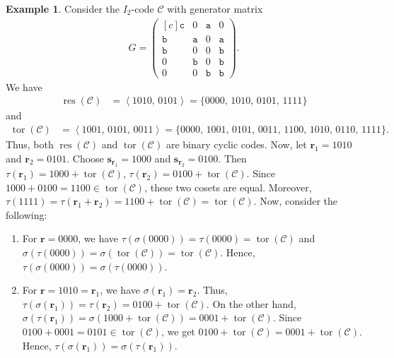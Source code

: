 \documentclass[12pt]{article}
\theoremstyle{definition}
\newtheorem{example}[example]{Example}
\theoremstyle{plain}
\begin{document}
\begin{example}
Consider the $I_2$-code $\mathcal{C}$ with generator matrix
\begin{align*}
G=
\begin{pmatrix*}[c]
\mathtt{c} & 0 & \mathtt{a} & 0 \\
\mathtt{b} & \mathtt{a} & 0 & \mathtt{a} \\
\mathtt{b} & 0 & 0 & \mathtt{b} \\
0 & \mathtt{b} & 0 & \mathtt{b} \\
0 & 0 & \mathtt{b} & \mathtt{b}
\end{pmatrix*}.
\end{align*}
We have
\begin{align*}
\operatorname{res}(\mathcal{C})
&=
\left\langle
1010,\,
0101
\right\rangle
=
\{
0000,\,
1010,\,
0101,\,
1111
\}
\end{align*}
and
\begin{align*}
\operatorname{tor}(\mathcal{C})
&=
\left\langle
1001,\,
0101,\,
0011
\right\rangle
=
\{
0000,\,
1001,\,
0101,\,
0011,\,
1100,\,
1010,\,
0110,\,
1111
\}.
\end{align*}
Thus, both $\operatorname{res}(\mathcal{C})$ and $\operatorname{tor}(\mathcal{C})$ are binary cyclic codes. Now, let
$
\mathbf{r}_1=1010
$
and
$
\mathbf{r}_2=0101
$.
Choose
$
\mathbf{s}_{\mathbf{r}_1}=1000
$
and
$
\mathbf{s}_{\mathbf{r}_2}=0100
$.
Then
$
\tau(\mathbf{r}_1)
=
1000+\operatorname{tor}(\mathcal{C})$,
$\tau(\mathbf{r}_2)
=
0100+\operatorname{tor}(\mathcal{C})
$.
Since
$
1000+0100=1100\in \operatorname{tor}(\mathcal{C})
$,
these two cosets are equal. Moreover,
$
\tau(1111)
=
\tau(\mathbf{r}_1+\mathbf{r}_2)
=
1100+\operatorname{tor}(\mathcal{C})
=
\operatorname{tor}(\mathcal{C})
$.
%
Now, consider the following:
\begin{enumerate}

\item[(i)]
For $\mathbf r=0000$, we have
$
\tau(\sigma(0000))
=
\tau(0000)
=
\operatorname{tor}(\mathcal{C})
$
and
$
\sigma(\tau(0000))
=
\sigma(\operatorname{tor}(\mathcal{C}))
=
\operatorname{tor}(\mathcal{C})
$.
Hence,
$
\tau(\sigma(0000))=\sigma(\tau(0000))
$.

\item[(ii)]
For $\mathbf r=1010=\mathbf{r}_1$, we have
$
\sigma(\mathbf{r}_1)=\mathbf{r}_2
$.
Thus,
$
\tau(\sigma(\mathbf{r}_1))
=
\tau(\mathbf{r}_2)
=
0100+\operatorname{tor}(\mathcal{C})
$.
On the other hand,
$
\sigma(\tau(\mathbf{r}_1))
=
\sigma(1000+\operatorname{tor}(\mathcal{C}))
=
0001+\operatorname{tor}(\mathcal{C})
$.
Since
$
0100+0001=0101\in\operatorname{tor}(\mathcal{C})
$,
we get
$
0100+\operatorname{tor}(\mathcal{C})
=
0001+\operatorname{tor}(\mathcal{C})
$.
Hence,
$
\tau(\sigma(\mathbf{r}_1))=\sigma(\tau(\mathbf{r}_1))
$.


\end{enumerate}
\end{example}
\end{document}
